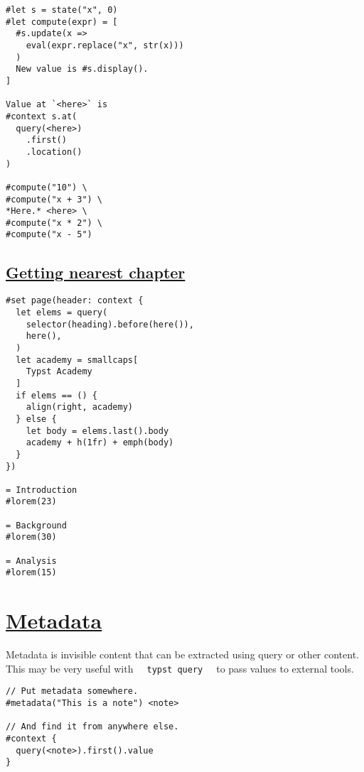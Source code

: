\begin{verbatim}
#let s = state("x", 0)
#let compute(expr) = [
  #s.update(x =>
    eval(expr.replace("x", str(x)))
  )
  New value is #s.display().
]

Value at `<here>` is
#context s.at(
  query(<here>)
    .first()
    .location()
)

#compute("10") \
#compute("x + 3") \
*Here.* <here> \
#compute("x * 2") \
#compute("x - 5")
\end{verbatim}

\pandocbounded{}

\subsection{\texorpdfstring{\hyperref[getting-nearest-chapter]{Getting
nearest
chapter}}{Getting nearest chapter}}\label{getting-nearest-chapter}

\begin{verbatim}
#set page(header: context {
  let elems = query(
    selector(heading).before(here()),
    here(),
  )
  let academy = smallcaps[
    Typst Academy
  ]
  if elems == () {
    align(right, academy)
  } else {
    let body = elems.last().body
    academy + h(1fr) + emph(body)
  }
})

= Introduction
#lorem(23)

= Background
#lorem(30)

= Analysis
#lorem(15)
\end{verbatim}

\pandocbounded{}

\section{\texorpdfstring{\hyperref[metadata]{Metadata}}{Metadata}}\label{metadata}

Metadata is invisible content that can be extracted using query or other
content. This may be very useful with
\texttt{\ }{\texttt{\ typst\ query\ }}\texttt{\ } to pass values to
external tools.

\begin{verbatim}
// Put metadata somewhere.
#metadata("This is a note") <note>

// And find it from anywhere else.
#context {
  query(<note>).first().value
}
\end{verbatim}

